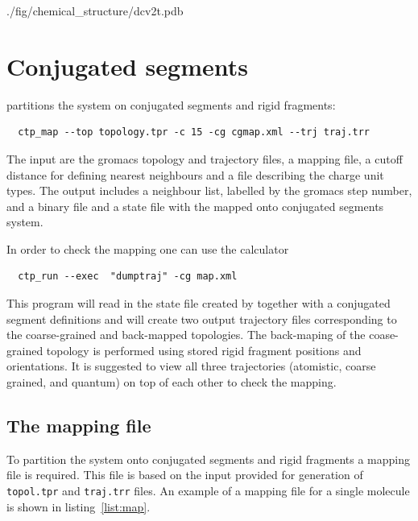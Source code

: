 %
{./fig/chemical_structure/dcv2t.pdb}

\section{Conjugated segments}

\ctpmap partitions the system on conjugated segments and rigid fragments:
\begin{verbatim}
  ctp_map --top topology.tpr -c 15 -cg cgmap.xml --trj traj.trr
\end{verbatim}
The input are the gromacs topology and trajectory files, a mapping file, a cutoff distance for defining nearest neighbours and a file describing the charge unit types. The output includes a neighbour list, labelled by the gromacs step number, and a binary 
file and a state file with the mapped onto conjugated segments system. 

In order to check the mapping one can use the \dumptraj calculator
\begin{verbatim}
  ctp_run --exec  "dumptraj" -cg map.xml 
\end{verbatim}

This program will read in the state file created by \ctpmap together with a conjugated segment definitions and will create two output trajectory files corresponding to the coarse-grained and back-mapped topologies. The back-maping of the coase-grained topology is performed using stored rigid fragment positions and orientations. It is suggested to view all three trajectories (atomistic, coarse grained, and quantum) on top of each other to check the mapping.

\subsection{The mapping file}
To partition the system onto conjugated segments and rigid fragments a mapping \xml file is required. This file is based on the input provided for generation of \texttt{topol.tpr} and \texttt{traj.trr} files. An example of a mapping file for a single \dcvt molecule is shown in listing~\ref{list:map}. 

